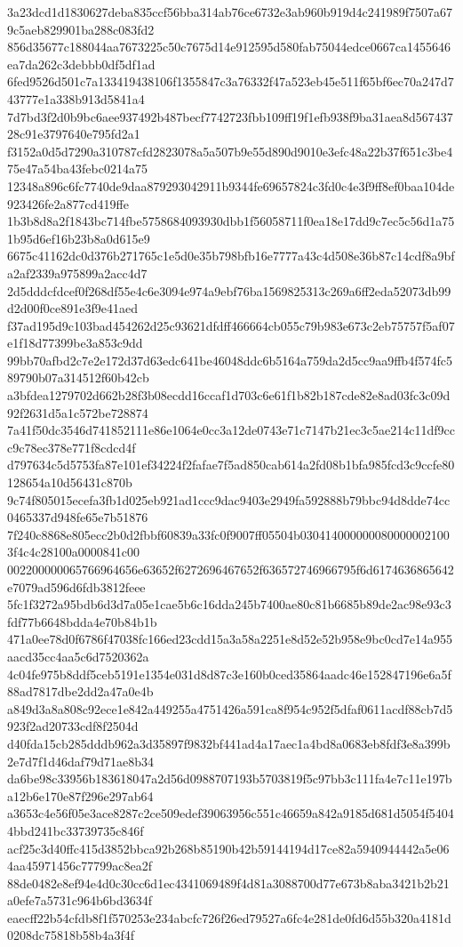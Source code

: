 {3a23dcd1d1830627deba835ccf56bba314ab76ce6732e3ab960b919d4c241989f7507a679c5aeb829901ba288c083fd2
856d35677c188044aa7673225c50c7675d14e912595d580fab75044edce0667ca1455646ea7da262c3debbb0df5df1ad
6fed9526d501c7a133419438106f1355847c3a76332f47a523eb45e511f65bf6ec70a247d743777e1a338b913d5841a4
7d7bd3f2d0b9bc6aee937492b487becf7742723fbb109ff19f1efb938f9ba31aea8d56743728c91e3797640e795fd2a1
f3152a0d5d7290a310787cfd2823078a5a507b9e55d890d9010e3efc48a22b37f651c3be475e47a54ba43febc0214a75
12348a896c6fc7740de9daa879293042911b9344fe69657824c3fd0c4e3f9ff8ef0baa104de923426fe2a877cd419ffe
1b3b8d8a2f1843bc714fbe5758684093930dbb1f56058711f0ea18e17dd9c7ec5c56d1a751b95d6ef16b23b8a0d615e9
6675c41162dc0d376b271765c1e5d0e35b798bfb16e7777a43c4d508e36b87c14cdf8a9bfa2af2339a975899a2acc4d7
2d5dddcfdcef0f268df55e4c6e3094e974a9ebf76ba1569825313c269a6ff2eda52073db99d2d00f0ce891e3f9e41aed
f37ad195d9c103bad454262d25c93621dfdff466664cb055c79b983e673c2eb75757f5af07e1f18d77399be3a853c9dd
99bb70afbd2c7e2e172d37d63edc641be46048ddc6b5164a759da2d5cc9aa9ffb4f574fc589790b07a314512f60b42cb
a3bfdea1279702d662b28f3b08ecdd16ccaf1d703c6e61f1b82b187cde82e8ad03fc3c09d92f2631d5a1c572be728874
7a41f50dc3546d741852111e86e1064e0cc3a12de0743e71c7147b21ec3c5ae214c11df9ccc9c78ec378e771f8cdcd4f
d797634c5d5753fa87e101ef34224f2fafae7f5ad850cab614a2fd08b1bfa985fcd3c9ccfe80128654a10d56431c870b
9c74f805015ecefa3fb1d025eb921ad1ccc9dac9403e2949fa592888b79bbc94d8dde74cc0465337d948fe65e7b51876
7f240c8868e805ecc2b0d2fbbf60839a33fc0f9007ff05504b0304140000000800000021003f4c4c28100a0000841c00
002200000065766964656e63652f6272696467652f636572746966795f6d6174636865642e7079ad596d6fdb3812feee
5fc1f3272a95bdb6d3d7a05e1cae5b6c16dda245b7400ae80c81b6685b89de2ac98e93c3fdf77b6648bdda4e70b84b1b
471a0ee78d0f6786f47038fc166ed23cdd15a3a58a2251e8d52e52b958e9bc0cd7e14a955aacd35cc4aa5c6d7520362a
4c04fe975b8ddf5ceb5191e1354e031d8d87c3e160b0ced35864aadc46e152847196e6a5f88ad7817dbe2dd2a47a0e4b
a849d3a8a808c92ece1e842a449255a4751426a591ca8f954c952f5dfaf0611acdf88cb7d5923f2ad20733cdf8f2504d
d40fda15cb285dddb962a3d35897f9832bf441ad4a17aec1a4bd8a0683eb8fdf3e8a399b2e7d7f1d46daf79d71ae8b34
da6be98c33956b183618047a2d56d0988707193b5703819f5c97bb3c111fa4e7c11e197ba12b6e170e87f296e297ab64
a3653c4e56f05e3ace8287c2ce509edef39063956c551c46659a842a9185d681d5054f54044bbd241bc33739735c846f
acf25c3d40ffc415d3852bbca92b268b85190b42b59144194d17ce82a5940944442a5e064aa45971456c77799ac8ea2f
88de0482e8ef94e4d0c30cc6d1ec4341069489f4d81a3088700d77e673b8aba3421b2b21a0efe7a5731c964b6bd3634f
eaecff22b54cfdb8f1f570253e234abcfc726f26ed79527a6fc4e281de0fd6d55b320a4181d0208dc75818b58b4a3f4f
}
